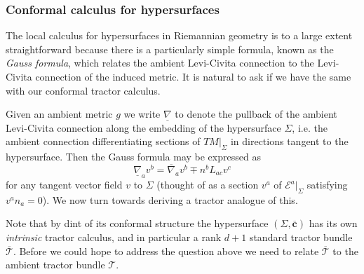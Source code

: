 \documentclass[a4paper,12pt]{amsart}
\def\Cal{\mathcal}
\newcommand{\cc}{\boldsymbol{c}}
\newcommand{\ce}{{\Cal E}}
\newcommand{\cT}{{\mathcal T}}
\theoremstyle{remark}
\begin{document}
\subsubsection{Conformal calculus for hypersurfaces}\label{hcalc}
 
The local calculus for hypersurfaces in Riemannian geometry is to a
large extent straightforward because there is a particularly simple
formula, known as the {\em Gauss formula}, which relates the ambient
Levi-Civita connection to the Levi-Civita connection of the induced
metric.  It is natural to ask if we have the same with our conformal
tractor calculus. 

Given an ambient metric $g$ we write $\underline{\nabla}$ to denote the pullback of the ambient Levi-Civita connection along the embedding of the hypersurface $\Sigma$, i.e. the ambient connection differentiating sections of $TM|_\Sigma$ in directions tangent to the hypersurface. Then the Gauss formula may be expressed as 
$$
\underline{\nabla}_a v^b = \overline{\nabla}_a v^b \mp   n^b L_{ac}v^c
$$
for any tangent vector field $v$ to $\Sigma$ (thought of as a section $v^a$ of $\ce^a|_\Sigma$ satisfying $v^a n_a=0$). We now turn towards deriving a tractor analogue of this.

\newcommand{\Proj}{\operatorname{Proj}}
\renewcommand{\S}{\Sigma}
\newcommand{\bcc}{\overline{\cc}} \newcommand{\bcT}{\overline{\cT}}
Note that by dint of its conformal structure the hypersurface
$(\Sigma,\bcc)$ has its own {\em intrinsic} tractor calculus, and in
particular a rank $d+1$ standard tractor bundle $\bcT$.  Before we
could hope to address the question above we need to relate $\bcT$ to
the ambient tractor bundle $\cT$.
\end{document}
